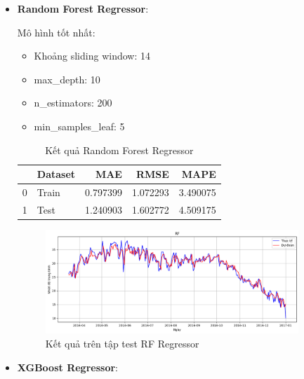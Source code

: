 \begin{itemize}
            \FloatBarrier
            
        \item \textbf{Random Forest Regressor}:

            Mô hình tốt nhất:
            \begin{itemize}
                \item Khoảng sliding window: 14
                \item max\_depth: 10
                \item n\_estimators: 200
                \item min\_samples\_leaf: 5
            \end{itemize}

            \begin{table}[htbp]
                \centering
                \caption{Kết quả Random Forest Regressor}
                \label{tab:weather-meantemp-rf}
                \begin{tabular}{llrrr}
                \hline
                 & Dataset & MAE & RMSE & MAPE \\
                \hline
                0 & Train & 0.797399 & 1.072293 & 3.490075 \\
                1 & Test & 1.240903 & 1.602772 & 4.509175 \\
                \hline
                \end{tabular}
            \end{table}
            
            \FloatBarrier

            \begin{figure}[htp]
                \centering
                \includegraphics[width=0.90\textwidth]{images/TS_weather_pred_cmp_RF.png}
                \caption{Kết quả trên tập test RF Regressor}
                \label{fig:TS_weather_pred_cmp_RF}
            \end{figure}
            \FloatBarrier

        \item \textbf{XGBoost Regressor}:
        

\end{itemize}
